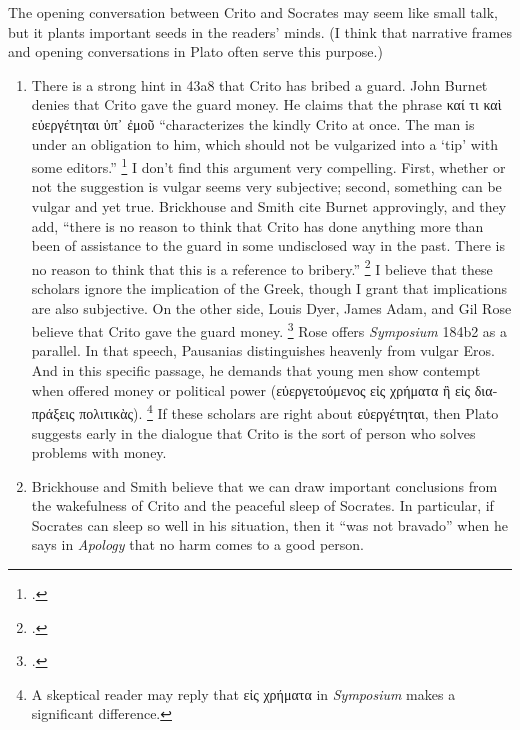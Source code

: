\documentclass[12pt,letterpaper]{article}
\begin{document}
The opening conversation between Crito and Socrates may seem like small talk, but it plants important seeds in the readers' minds.
(I think that narrative frames and opening conversations in Plato often serve this purpose.)

\begin{enumerate}

    \item There is a strong hint in 43a8 that Crito has bribed a guard.
        John Burnet denies that Crito gave the guard money.
        He claims that the phrase \textgreek{καί τι καὶ εὐεργέτηται ὑπ᾽ ἐμοῦ} ``characterizes the kindly Crito at once.
        The man is under an obligation to him, which should not be vulgarized into a `tip' with some editors.''%
        \footcite[][on 43a8]{burnet1924-euthyphro-apology-crito} I don't find this argument very compelling.
        First, whether or not the suggestion is vulgar seems very subjective; second, something can be vulgar and yet true.
        Brickhouse and Smith cite Burnet approvingly, and they add, ``there is no reason to think that Crito has done anything more than been of assistance to the guard in some undisclosed way in the past.
        There is no reason to think that this is a reference to bribery.''%
        \footcite[][249]{brickhouse-smith2004-plato-trial-of-socrates}  I believe that these scholars ignore the implication of the Greek, though I grant that implications are also subjective.
        On the other side, Louis Dyer, James Adam, and Gil Rose believe that Crito gave the guard money.
        \footcites[][on 43a9]{dyer-apology-crito-2007}[][on 43a9]{adam1988-crito}[][on 43a8]{rose-crito-1983}
        Rose offers \textit{Symposium} 184b2 as a parallel.
        In that speech, Pausanias distinguishes heavenly from vulgar Eros.
        And in this specific passage, he demands that young men show contempt when offered money or political power (\textgreek{εὐεργετούμενος εἰς χρήματα ἢ εἰς διαπράξεις πολιτικὰς}).%
\footnote{A skeptical reader may reply that \textgreek{εἰς χρήματα} in \textit{Symposium} makes a significant difference.}
        If these scholars are right about \textgreek{εὐεργέτηται}, then Plato suggests early in the dialogue that Crito is the sort of person who solves problems with money.
    \item Brickhouse and Smith believe that we can draw important conclusions from the wakefulness of Crito and the peaceful sleep of Socrates.
        In particular, if Socrates can sleep so well in his situation, then it ``was not bravado'' when he says in \textit{Apology} that no harm comes to a good person.%

\end{enumerate}
\end{document}
